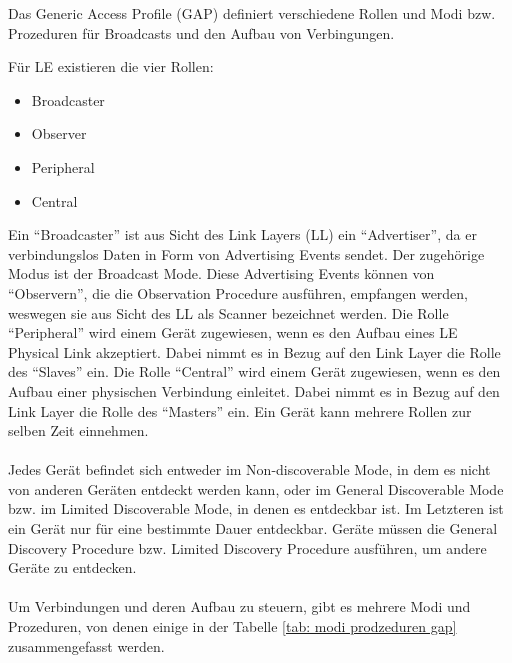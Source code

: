 Das Generic Access Profile (GAP) definiert verschiedene Rollen und Modi bzw. Prozeduren für Broadcasts und den Aufbau von Verbingungen.

Für LE existieren die vier Rollen:
\begin{itemize}
    \item Broadcaster
    \item Observer
    \item Peripheral
    \item Central
\end{itemize}
Ein "`Broadcaster"' ist aus Sicht des Link Layers (LL) ein "`Advertiser"', da er verbindungslos Daten in Form von Advertising Events sendet. Der zugehörige Modus ist der Broadcast Mode. Diese Advertising Events können von "`Observern"', die die Observation Procedure ausführen, empfangen werden, weswegen sie aus Sicht des LL als Scanner bezeichnet werden. Die Rolle "`Peripheral"' wird einem Gerät zugewiesen, wenn es den Aufbau eines LE Physical Link akzeptiert. Dabei nimmt es in Bezug auf den Link Layer die Rolle des "`Slaves"' ein. Die Rolle "`Central"' wird einem Gerät zugewiesen, wenn es den Aufbau einer physischen Verbindung einleitet. Dabei nimmt es in Bezug auf den Link Layer die Rolle des "`Masters"' ein. Ein Gerät kann mehrere Rollen zur selben Zeit einnehmen. \cite{BtSpec4.0_1638-1639} \cite{BtSpec4.0_1695-1697}
\\\\
Jedes Gerät befindet sich entweder im Non-discoverable Mode, in dem es nicht von anderen Geräten entdeckt werden kann, oder im General Discoverable Mode bzw. im Limited Discoverable Mode, in denen es entdeckbar ist. Im Letzteren ist ein Gerät nur für eine bestimmte Dauer entdeckbar. Geräte müssen die General Discovery Procedure bzw. Limited Discovery Procedure ausführen, um andere Geräte zu entdecken. \cite{BtSpec4.0_1697}
\\\\
Um Verbindungen und deren Aufbau zu steuern, gibt es mehrere Modi und Prozeduren, von denen einige in der Tabelle \ref{tab: modi prodzeduren gap} zusammengefasst werden.

